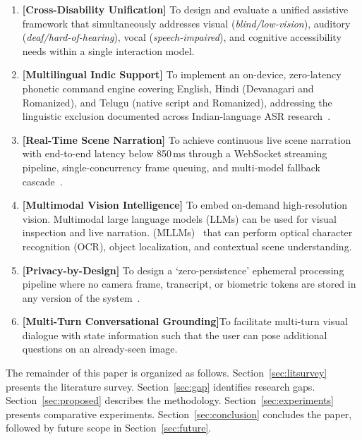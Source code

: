 \documentclass[pdflatex,sn-mathphys-num]{sn-jnl}
\theoremstyle{thmstyleone}%
\theoremstyle{thmstyletwo}%
\theoremstyle{thmstylethree}%
\begin{document}
\begin{enumerate}
  \item \textbf{[Cross-Disability Unification]} To design and evaluate a unified
  assistive framework that simultaneously addresses visual (\textit{blind/low-vision}),
  auditory (\textit{deaf/hard-of-hearing}), vocal (\textit{speech-impaired}), and
  cognitive accessibility needs within a single interaction model.

  \item \textbf{[Multilingual Indic Support]} To implement an on-device, zero-latency
  phonetic command engine covering English, Hindi (Devanagari and Romanized), and
  Telugu (native script and Romanized), addressing the linguistic exclusion documented
  across Indian-language ASR research~\cite{kumar2022indic}.

  \item \textbf{[Real-Time Scene Narration]} To achieve continuous live scene narration
  with end-to-end latency below 850\,ms through a WebSocket streaming pipeline,
  single-concurrency frame queuing, and multi-model fallback cascade~\cite{fette2011websocket}.

\item \textbf{[Multimodal Vision Intelligence]} To embed on-demand high-resolution vision.
Multimodal large language models (LLMs) can be used for visual inspection and live narration.
(MLLMs)~\cite{team2023gemini} that can perform optical character recognition (OCR), object
localization, and contextual scene understanding.

\item \textbf{[Privacy-by-Design]} To design a `zero-persistence' ephemeral processing
pipeline where no camera frame, transcript, or biometric tokens are stored in
any version of the system~\cite{w3c2023wcag}.

\item \textbf{[Multi-Turn Conversational Grounding]}To facilitate multi-turn visual dialogue with state information such that the user can pose additional questions on an already-seen image.
\end{enumerate}

The remainder of this paper is organized as follows. Section~\ref{sec:litsurvey}
presents the literature survey. Section~\ref{sec:gap} identifies research gaps.
Section~\ref{sec:proposed} describes the methodology. Section~\ref{sec:experiments}
presents comparative experiments. Section~\ref{sec:conclusion} concludes the paper,
followed by future scope in Section~\ref{sec:future}.
\end{document}
